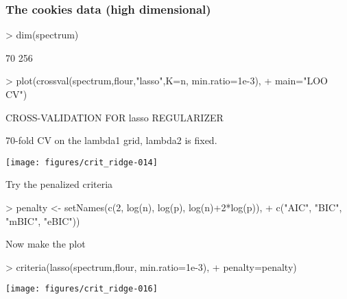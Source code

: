 \begin{frame}
  \frametitle{The cookies data (high dimensional)}


\begin{Schunk}
\begin{Sinput}
> dim(spectrum)
\end{Sinput}
\begin{Soutput}
[1]  70 256
\end{Soutput}
\begin{Sinput}
> plot(crossval(spectrum,flour,"lasso",K=n, min.ratio=1e-3),
+      main="LOO CV")
\end{Sinput}
\begin{Soutput}
CROSS-VALIDATION FOR  lasso  REGULARIZER 

70-fold CV on the lambda1 grid, lambda2 is fixed.
\end{Soutput}
\end{Schunk}

\texttt{[image: figures/crit\_ridge-014]}

\vspace{2cm}

Try the penalized criteria
\begin{Schunk}
\begin{Sinput}
> penalty <- setNames(c(2, log(n), log(p), log(n)+2*log(p)),
+                     c("AIC", "BIC", "mBIC", "eBIC"))
\end{Sinput}
\end{Schunk}

Now make the plot
\begin{Schunk}
\begin{Sinput}
> criteria(lasso(spectrum,flour, min.ratio=1e-3),
+          penalty=penalty)
\end{Sinput}
\end{Schunk}
\texttt{[image: figures/crit\_ridge-016]}

\end{frame}

